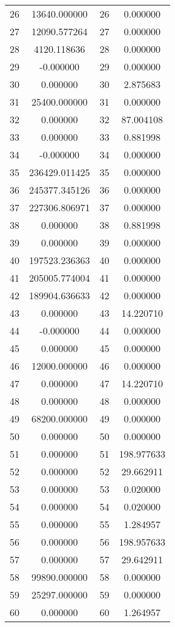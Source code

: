 \documentclass[12pt]{article}
\begin{document}
\begin{longtable}{@{}cccc@{}}
26 & 13640.000000 & 26 & 0.000000 \\
27 & 12090.577264 & 27 & 0.000000 \\
28 & 4120.118636 & 28 & 0.000000 \\
29 & -0.000000 & 29 & 0.000000 \\
30 & 0.000000 & 30 & 2.875683 \\
31 & 25400.000000 & 31 & 0.000000 \\
32 & 0.000000 & 32 & 87.004108 \\
33 & 0.000000 & 33 & 0.881998 \\
34 & -0.000000 & 34 & 0.000000 \\
35 & 236429.011425 & 35 & 0.000000 \\
36 & 245377.345126 & 36 & 0.000000 \\
37 & 227306.806971 & 37 & 0.000000 \\
38 & 0.000000 & 38 & 0.881998 \\
39 & 0.000000 & 39 & 0.000000 \\
40 & 197523.236363 & 40 & 0.000000 \\
41 & 205005.774004 & 41 & 0.000000 \\
42 & 189904.636633 & 42 & 0.000000 \\
43 & 0.000000 & 43 & 14.220710 \\
44 & -0.000000 & 44 & 0.000000 \\
45 & 0.000000 & 45 & 0.000000 \\
46 & 12000.000000 & 46 & 0.000000 \\
47 & 0.000000 & 47 & 14.220710 \\
48 & 0.000000 & 48 & 0.000000 \\
49 & 68200.000000 & 49 & 0.000000 \\
50 & 0.000000 & 50 & 0.000000 \\
51 & 0.000000 & 51 & 198.977633 \\
52 & 0.000000 & 52 & 29.662911 \\
53 & 0.000000 & 53 & 0.020000 \\
54 & 0.000000 & 54 & 0.020000 \\
55 & 0.000000 & 55 & 1.284957 \\
56 & 0.000000 & 56 & 198.957633 \\
57 & 0.000000 & 57 & 29.642911 \\
58 & 99890.000000 & 58 & 0.000000 \\
59 & 25297.000000 & 59 & 0.000000 \\
60 & 0.000000 & 60 & 1.264957 \\

\end{longtable}
\end{document}
